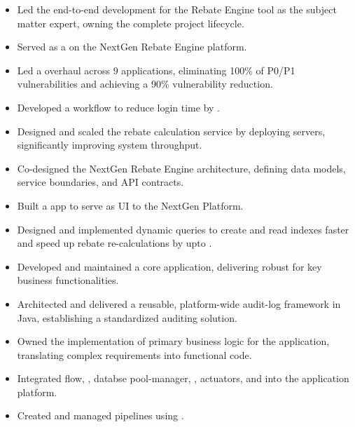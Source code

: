 \documentclass[10pt,a4paper,ragged2e, normalphoto]{altacv}
\begin{document}
\begin{itemize}
  \item Led the end-to-end development for the Rebate Engine tool as the subject matter expert, owning the complete project lifecycle.
  \item Served as a  on the NextGen Rebate Engine platform.
  \item Led a  overhaul across 9 applications, eliminating 100\% of P0/P1 vulnerabilities and achieving a 90\% vulnerability reduction.
  \item Developed a  workflow to reduce login time by .
  \item Designed and scaled the rebate calculation service by deploying  servers, significantly improving system throughput.
  \item Co-designed the NextGen Rebate Engine architecture, defining data models, service boundaries, and API contracts.
  \item Built a  app to serve as UI to the NextGen Platform.
  \item Designed and implemented dynamic  queries to create and read indexes faster and speed up rebate re-calculations by upto .
\end{itemize}
\begin{itemize}
	\item Developed and maintained a core  application, delivering robust  for key business functionalities.
	\item Architected and delivered a reusable, platform-wide audit-log framework in Java, establishing a standardized auditing solution.
	\item Owned the implementation of primary business logic for the application, translating complex requirements into functional code.
	\item Integrated  flow, , databse pool-manager, , actuators, and  into the application platform.
	\item Created and managed  pipelines using .
 \end{itemize}
\end{document}
